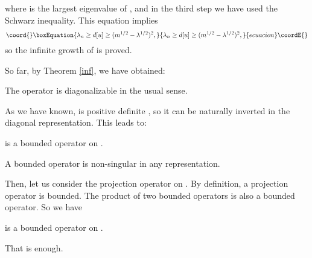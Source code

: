 \documentclass[a4paper,a4paper]{article}
\begin{document}
where \myHighlight{$\lambda$}\coordHE{} is the largest eigenvalue of \coordHE{}, and in the third step we have used the Schwarz
inequality. This equation implies
\begin{equation}\coord{}\boxEquation{
\lambda_n\geq d[u]\geq(m^{1/2}-\lambda^{1/2})^2,
}{
\lambda_n\geq d[u]\geq(m^{1/2}-\lambda^{1/2})^2,
}{ecuacion}\coordE{}\end{equation}
so the infinite growth of \coordHE{} is proved.

So far, by Theorem \ref{inf}, we have obtained:
\begin{propo}
The operator \coordHE{} is diagonalizable in the usual sense.
\end{propo}
As we have known, \coordHE{} is positive definite \cite{Reviewa}, so
it can be naturally inverted in the diagonal representation. This
leads to:
\begin{propo}
\coordHE{} is a bounded operator on \coordHE{}.
\end{propo}
A bounded operator is non-singular in any representation.

Then, let us consider the projection operator \coordHE{} on \coordHE{}. By
definition, a projection operator is bounded. The product of two
bounded operators is also a bounded operator. So we have
\begin{propo}
\coordHE{} is a bounded operator on
\coordHE{}.
\end{propo}
That is enough.
\end{document}
